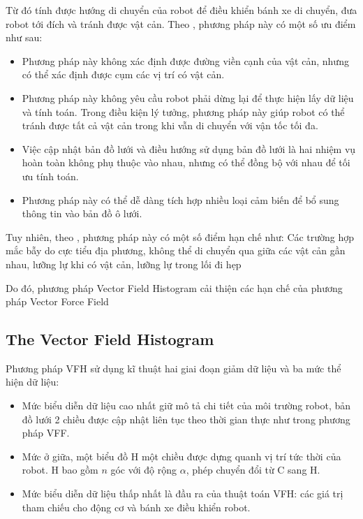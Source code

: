 Từ đó tính được hướng di chuyển của robot để điều khiển bánh xe di chuyển, đưa robot tới đích và tránh được vật cản. Theo \cite{Borenstein1988}, phương pháp này có một số ưu điểm như sau:
\begin{itemize}
  \item Phương pháp này không xác định được đường viền cạnh của vật cản, nhưng có thể xác định được cụm các vị trí có vật cản.
  \item Phương pháp này không yêu cầu robot phải dừng lại để thực hiện lấy dữ liệu và tính toán. Trong điều kiện lý tưởng, phương pháp này giúp robot có thể tránh được tất cả vật cản trong khi vẫn di chuyển với vận tốc tối đa.
  \item Việc cập nhật bản đồ lưới và điều hướng sử dụng bản đồ lưới là hai nhiệm vụ hoàn toàn không phụ thuộc vào nhau, nhưng có thể đồng bộ với nhau để tối ưu tính toán.
  \item Phương pháp này có thể dễ dàng tích hợp nhiều loại cảm biến để bổ sung thông tin vào bản đồ ô lưới.
\end{itemize}

Tuy nhiên, theo \cite{Koren1991}, phương pháp này có một số điểm hạn chế như: Các trường hợp mắc bẫy do cực tiểu địa phương, không thể di chuyển qua giữa các vật cản gần nhau, lưỡng lự khi có vật cản, lưỡng lự trong lối đi hẹp

Do đó, phương pháp Vector Field Histogram cải thiện các hạn chế của phương pháp Vector Force Field

\subsection{The Vector Field Histogram}
\label{sub:VFH}
Phương pháp VFH \cite{Borenstein1991} sử dụng kĩ thuật hai giai đoạn giảm dữ liệu và ba mức thể hiện dữ liệu:

\begin{itemize}
  \item Mức biểu diễn dữ liệu cao nhất giữ mô tả chi tiết của môi trường robot, bản đồ lưới 2 chiều được cập nhật liên tục theo thời gian thực như trong phương pháp VFF.
  \item Mức ở giữa, một biểu đồ H một chiều được dựng quanh vị trí tức thời của robot. H bao gồm $n$ góc với độ rộng $\alpha$, phép chuyển đổi từ C sang H.
  \item Mức biểu diễn dữ liệu thấp nhất là đầu ra của thuật toán VFH: các giá trị tham chiếu cho động cơ và bánh xe điều khiển robot.
\end{itemize}

